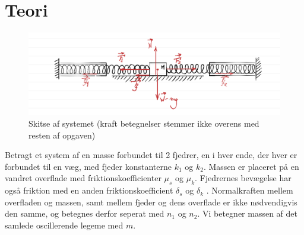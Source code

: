\chapter{Teori}
%
\begin{figure}[htpb]
    \centering
    \includegraphics[width=0.8\linewidth,origin=c]{figures/systemskitse.png}
    \caption{Skitse af systemet (kraft betegnelser stemmer ikke overens med resten af opgaven)}
    \label{fig:skitse}
\end{figure}
%
Betragt et system af en masse forbundet til 2 fjedrer, en i hver ende, der hver er forbundet til en væg, med fjeder konstanterne $k_1$ og $k_2$. 
Massen er placeret på en vandret overflade med friktionskoefficienter $\mu_s$ og $\mu_k$. 
Fjedrernes bevægelse har også friktion med en anden friktionskoefficient $\delta_s$ og $\delta_k$ \cite{YF}.
Normalkraften mellem overfladen og massen, samt mellem fjeder og dens overflade er ikke nødvendigvis den samme, og betegnes derfor seperat med $n_1$ og $n_2$.
Vi betegner massen af det samlede oscillerende legeme med $m$. 

